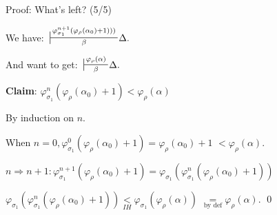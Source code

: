 \documentclass[10pt]{beamer}
\newcommand{\sintcons}[2]{\;\sststile{#2}{#1}\!}
\begin{document}
\begin{frame}{Proof: What's left? (5/5)}

We have: $\sintcons{\varphi_{\sigma_1}^{n+1}(\varphi_{\rho}(\alpha_0)+1)))}{\beta} \Delta.$

And want to get: $\sintcons{\varphi_\rho(\alpha)}{\beta} \Delta.$ \bigskip



\pause


\textbf{Claim}: $\varphi_{\sigma_1}^n(\varphi_\rho(\alpha_0)+1) < \varphi_\rho(\alpha)$ \pause



By induction on $n$. \pause


When $n=0, \varphi_{\sigma_1}^0(\varphi_\rho(\alpha_0)+1) = \varphi_\rho(\alpha_0)+1$ \pause  $< \varphi_\rho(\alpha)$.  \bigskip



\pause

$n \Rightarrow n+1: \varphi_{\sigma_1}^{n+1}(\varphi_\rho(\alpha_0)+1) = \varphi_{\sigma_1}(\varphi_{\sigma_1}^n(\varphi_\rho(\alpha_0)+1))$ \pause



$\varphi_{\sigma_1}(\varphi_{\sigma_1}^n(\varphi_\rho(\alpha_0)+1)) \underset{IH}{<} \varphi_{\sigma_1}(\varphi_\rho(\alpha))$ \pause $ \underset{\text{by def}}{=} \varphi_\rho(\alpha)$.
\qed


\end{frame}
\end{document}
